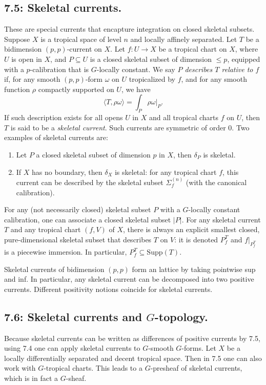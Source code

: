 \documentclass[12pt,reqno]{amsart}
\theoremstyle{definition}
\theoremstyle{remark}
\theoremstyle{citedrem}
\theoremstyle{cited}
\theoremstyle{citeddef}
\theoremstyle{step}
\begin{document}
\subsection*{7.5: Skeletal currents. } These are special currents that encapture integration on closed skeletal subsets. Suppose $X$ is a tropical space of level $n$ and locally affinely separated. Let $T$ be a bidimension $(p,p)$-current on $X$. Let $f \colon U \to X$ be a tropical chart on $X$, where $U$ is open in $X$, and $P \subseteq U$ is a closed skeletal subset of dimension $\leq p$, equipped with a $p$-calibration that is $G$-locally constant. We say \emph{$P$ describes $T$ relative to $f$} if, for any smooth $(p,p)$-form $\omega$ on $U$ tropicalized by $f$, and for any smooth function $\rho$ compactly supported on $U$, we have 
\[\langle T, \rho \omega \rangle = \int_P \rho \omega|_P.\] If such description exists for all opens $U$ in $X$ and all tropical charts $f$ on $U$, then $T$ is said to be a \emph{skeletal current}. Such currents are symmetric of order $0$. Two examples of skeletal currents are: 
\begin{enumerate}
    \item Let $P$ a closed skeletal subset of dimension $p$ in $X$, then $\delta_P$ is skeletal. 
    \item If $X$ has no boundary, then $\delta_X$ is skeletal: for any tropical chart $f$, this current can be described by the skeletal subset $\Sigma_f^{(n)}$ (with the canonical calibration). 
\end{enumerate}

For any (not necessarily closed) skeletal subset $P$ with a $G$-locally constant calibration, one can associate a closed skeletal subset $|P|$. For any skeletal current $T$ and any tropical chart $(f,V)$ of $X$, there is always an explicit smallest closed, pure-dimensional skeletal subset that describes $T$ on $V$: it is denoted $P^T_f$ and $f|_{P^T_f}$ is a piecewise immersion. In particular, $P^T_f \subseteq \mathrm{Supp}(T)$. 

Skeletal currents of bidimension $(p,p)$ form an lattice by taking pointwise sup and inf. In particular, any skeletal current can be decomposed into two positive currents. Different positivity notions coincide for skeletal currents. 

\subsection*{7.6: Skeletal currents and $G$-topology. }
Because skeletal currents can be written as differences of positive currents by 7.5, using 7.4 one can apply skeletal currents to $G$-smooth $G$-forms. Let $X$ be a locally differentially separated and decent tropical space. Then in 7.5 one can also work with $G$-tropical charts. This leads to a $G$-presheaf of skeletal currents, which is in fact a $G$-sheaf. 
\end{document}
